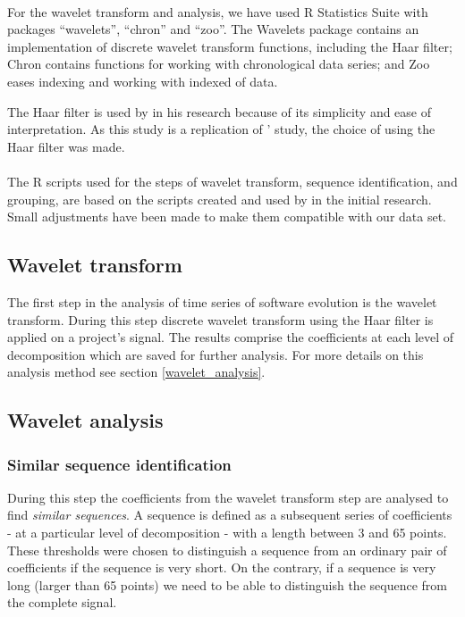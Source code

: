 \paragraph{}
For the wavelet transform and analysis, we have used R Statistics Suite
with packages ``wavelets'', ``chron'' and ``zoo''. The Wavelets package
contains an implementation of discrete wavelet transform functions, including
the Haar filter; Chron contains functions for working with chronological data
series; and Zoo eases indexing and working with indexed of data.

The Haar filter is used by \citet{karus2013} in his research because of its
simplicity and ease of interpretation. As this study is a replication of
\citeauthor{karus2013}' study, the choice of using the Haar filter was made.

\paragraph{}
The R scripts used for the steps of wavelet transform, sequence identification,
and grouping, are based on the scripts created and used by
\citeauthor{karus2013} in the initial research. Small adjustments have been
made to make them compatible with our data set.

\subsection{Wavelet transform}
The first step in the analysis of time series of software evolution is the
wavelet transform. During this step discrete wavelet transform using the Haar
filter is applied on a project's signal. The results comprise the coefficients
at each level of decomposition which are saved for further analysis. For more
details on this analysis method see section \ref{wavelet_analysis}.

\subsection{Wavelet analysis}
\subsubsection{Similar sequence identification}
During this step the coefficients from the wavelet transform step are
analysed to find \emph{similar sequences}\rm. A sequence is defined as a
subsequent series of coefficients - at a particular level of decomposition -
with a length between 3 and 65 points.
These thresholds were chosen to distinguish a sequence from an ordinary pair of
coefficients if the sequence is very short. On the contrary, if a sequence is
very long (larger than 65 points) we need to be able to distinguish the
sequence from the complete signal.

